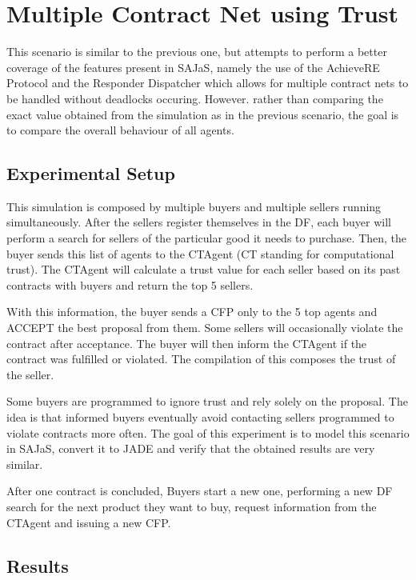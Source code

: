\section{Multiple Contract Net using Trust}

This scenario is similar to the previous one, but attempts to perform a better coverage of the features present in SAJaS, namely the use of the AchieveRE Protocol and the Responder Dispatcher which allows for multiple contract nets to be handled without deadlocks occuring. However. rather than comparing the exact value obtained from the simulation as in the previous scenario, the goal is to compare the overall behaviour of all agents.

\subsection{Experimental Setup}
This simulation is composed by multiple buyers and multiple sellers running simultaneously. After the sellers register themselves in the DF, each buyer will perform a search for sellers of the particular good it needs to purchase. Then, the buyer sends this list of agents to the CTAgent (CT standing for computational trust). The CTAgent will calculate a trust value for each seller based on its past contracts with buyers and return the top 5 sellers.

With this information, the buyer sends a CFP only to the 5 top agents and ACCEPT the best proposal from them. Some sellers will occasionally violate the contract after acceptance. The buyer will then inform the CTAgent if the contract was fulfilled or violated. The compilation of this composes the trust of the seller.

Some buyers are programmed to ignore trust and rely solely on the proposal. The idea is that informed buyers eventually avoid contacting sellers programmed to violate contracts more often. The goal of this experiment is to model this scenario in SAJaS, convert it to JADE and verify that the obtained results are very similar.

After one contract is concluded, Buyers start a new one, performing a new DF search for the next product they want to buy, request information from the CTAgent and issuing a new CFP.

\subsection{Results}

